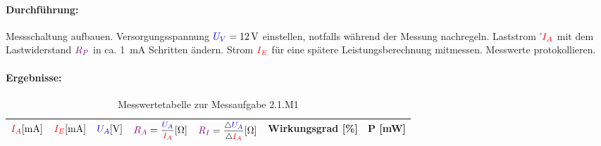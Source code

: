 \documentclass[a4paper,titlepage,parskip]{scrreprt}
\newcommand{\spannung}[1]{\textcolor{blue}{#1}}
\newcommand{\strom}[1]{\textcolor{red}{#1}}
\newcommand{\widerstand}[1]{\textcolor{violet}{#1}}
\begin{document}
              \paragraph{Durchführung:} Messschaltung aufbauen. Versorgungsspannung $\spannung{U_V} = \SI{12}{\volt}$ einstellen, notfalls
              während der Messung nachregeln. Laststrom '$\strom{I_A}$ mit dem Lastwiderstand $\widerstand{R_P}$ in
              ca. \SI{1}{\milli\ampere} Schritten ändern. Strom $\strom{I_E}$ für eine spätere Leistungsberechnung mitmessen.
              Messwerte protokollieren.

              \paragraph{Ergebnisse:}
                \begin{center}
                    \begin{table}[!hbtp]
                        \caption{Messwertetabelle zur Messaufgabe 2.1.M1}
                        \label{tbl:messergebnisse2.1}
                        \renewcommand{\arraystretch}{1.3}
                         \begin{center}
                            \begin{tabular}{ccccccc}
                                $\strom{I_A} [\si{\milli\ampere}]$  &
                                $\strom{I_E} [\si{\milli\ampere}]$ &
                                $\spannung{U_A} [\si{\volt}]$ &
                                $\widerstand{R_A} = \mfrac{\spannung{U_A}}{\strom{I_A}} [\si{\ohm}]$ &
                                $\widerstand{R_I} = \mfrac{\triangle\spannung{U_A}}{\triangle\strom{I_A}} [\si{\ohm}]$ &
                                Wirkungsgrad [\%] &%
                                P [\si{\milli\watt}] %
                                \\ \hline


\end{tabular}
\end{center}
\end{table}
\end{center}
\end{document}
